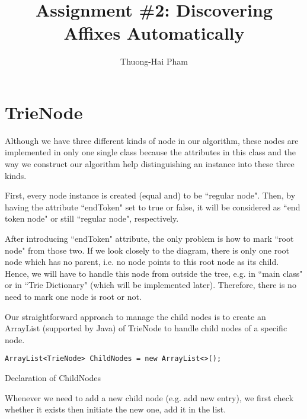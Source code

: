 \documentclass[]{article}
\title{Assignment \#2: Discovering Affixes Automatically}
\author{Thuong-Hai Pham}
\begin{document}
\maketitle

\begin{abstract}

\end{abstract}

\section{TrieNode}

Although we have three different kinds of node in our algorithm, these nodes are implemented in only one single class because the attributes in this class and the way we construct our algorithm help distinguishing an instance into these three kinds.

First, every node instance is created (equal and) to be ``regular node". Then, by having the attribute ``endToken" set to true or false, it will be considered as ``end token node" or still ``regular node", respectively.

After introducing ``endToken" attribute, the only problem is how to mark ``root node" from those two. If we look closely to the diagram, there is only one root node which has no parent, i.e. no node points to this root node as its child. Hence, we will have to handle this node from outside the tree, e.g. in ``main class" or in 
``Trie Dictionary" (which will be implemented later). Therefore, there is no need to mark one node is root or not.

Our straightforward approach to manage the child nodes is to create an ArrayList (supported by Java) of TrieNode to handle child nodes of a specific node.
\begin{listing}[ht]
	\begin{verbatim}
ArrayList<TrieNode> ChildNodes = new ArrayList<>();
	\end{verbatim}
	\caption{Declaration of ChildNodes}
\end{listing}

Whenever we need to add a new child node (e.g. add new entry), we first check whether it exists then initiate the new one, add it in the list.
\end{document}
